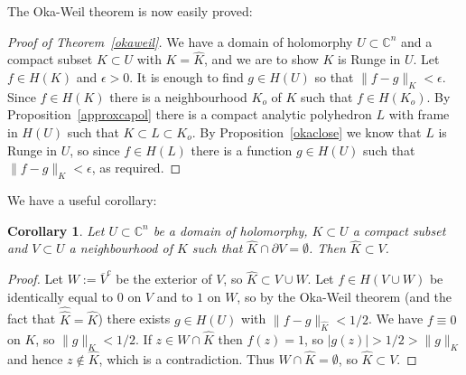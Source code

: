 \documentclass[11pt,a4paper, final, twoside]{article}
\newtheorem{corollary}[theorem]{Corollary}
\numberwithin{equation}{section}
\newcommand{\C}{\mathbb C}
\newcommand{\clos}[1]{\overline{#1}}
\newcommand{\bd}{\partial}
\newcommand{\hol}{H}
\begin{document}
The Oka-Weil theorem is now easily proved:
\begin{proof}[Proof of Theorem~\ref{okaweil}]
We have a domain of holomorphy $U\subset\C^n$ and a compact subset $K\subset U$ with $K=\hat K$, and we are to show $K$ is Runge in $U$.
Let $f\in\hol(K)$ and $\epsilon>0$. It is enough to find $g\in\hol(U)$ so that $\|f-g\|_K<\epsilon$. Since $f\in\hol(K)$ there is a neighbourhood
$K_o$ of $K$ such that $f\in\hol(K_o)$. By Proposition~\ref{approxcapol} there is a compact analytic polyhedron $L$ with frame in $\hol(U)$ such that $K\subset L\subset K_o$.
By Proposition~\ref{okaclose} we know that $L$ is Runge in $U$, so since $f\in\hol(L)$ there is a function $g\in\hol(U)$ such that $\|f-g\|_K<\epsilon$, as required.
\end{proof}
We have a useful corollary:
\begin{corollary}
\label{okaweilcor}
Let $U\subset\C^n$ be a domain of holomorphy, $K\subset U$ a compact subset and $V\subset U$ a neighbourhood of $K$ such that $\hat K\cap \bd V=\emptyset$. Then
$\hat K\subset V$. 
\end{corollary}
\begin{proof}
Let $W:=\clos{V}^c$ be the exterior of $V$, so $\hat K\subset V\cup W$.
Let $f\in\hol(V\cup W)$ be identically equal to $0$ on $V$ and to $1$ on $W$, so by the Oka-Weil theorem (and the
fact that $\hat{\hat K}=\hat K$) there exists $g\in\hol(U)$ with $\|f-g\|_{\hat K}<1/2$. We have $f\equiv 0$ on $K$, so $\|g\|_K< 1/2$.
If $z\in W\cap\hat K$ then $f(z)=1$, so $|g(z)|>1/2> \|g\|_K$ and hence $z\not\in\hat K$, which is a contradiction. Thus $W\cap\hat K=\emptyset$, so $\hat K\subset V$.
\end{proof}
\end{document}
